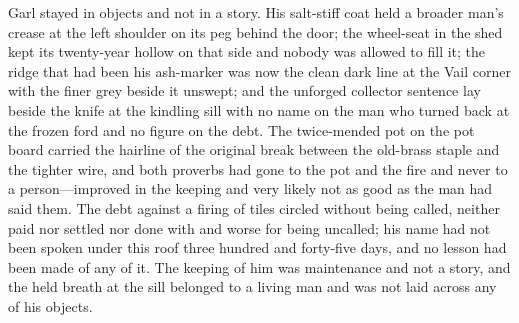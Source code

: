 Garl stayed in objects and not in a story. His salt-stiff coat held a broader man's crease at the left shoulder on its peg behind the door; the wheel-seat in the shed kept its twenty-year hollow on that side and nobody was allowed to fill it; the ridge that had been his ash-marker was now the clean dark line at the Vail corner with the finer grey beside it unswept; and the unforged collector sentence lay beside the knife at the kindling sill with no name on the man who turned back at the frozen ford and no figure on the debt. The twice-mended pot on the pot board carried the hairline of the original break between the old-brass staple and the tighter wire, and both proverbs had gone to the pot and the fire and never to a person---improved in the keeping and very likely not as good as the man had said them. The debt against a firing of tiles circled without being called, neither paid nor settled nor done with and worse for being uncalled; his name had not been spoken under this roof three hundred and forty-five days, and no lesson had been made of any of it. The keeping of him was maintenance and not a story, and the held breath at the sill belonged to a living man and was not laid across any of his objects.

\scenebreak

